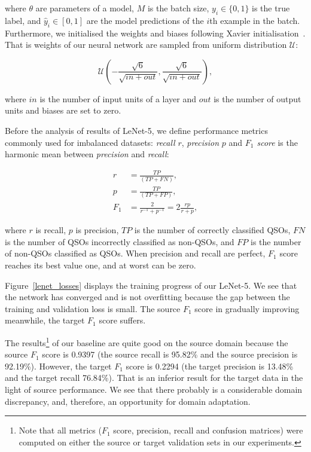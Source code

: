 where \(\theta\) are parameters of a model,
\(M\) is the batch size,
\(y_i \in \{0, 1\}\) is the true label,
and \(\hat{y}_i \in [0, 1]\) are the model predictions of the \(i\)th example in the batch.
Furthermore, we initialised the weights and biases following Xavier initialisation~\cite{glorot2010}.
That is weights of our neural network are sampled from uniform distribution \(\mathcal{U}\):

\begin{equation}
	\mathcal{U}\left(
	-\frac{\sqrt{6}}{\sqrt{\mathit{in} + \mathit{out}}},
	\frac{\sqrt{6}}{\sqrt{\mathit{in} + \mathit{out}}}
	\right),
\end{equation}

where \(\mathit{in}\) is the number of input units of a layer
and \(\mathit{out}\) is the number of output units
and biases are set to zero.

Before the analysis of results of LeNet-5,
we define performance metrics commonly used for imbalanced datasets:
\textit{recall} \(r\), \textit{precision} \(p\) and \textit{\(F_1\) score} is the harmonic mean between \textit{precision} and \textit{recall}:

\begin{align}
	r &= \frac{\mathit{TP}}{(\mathit{TP} + \mathit{FN})}, \\
	p &= \frac{\mathit{TP}}{(\mathit{TP} + \mathit{FP})}, \\
	F_1 &= \frac{2}{r^{-1} + p^{-1}} = 2 \frac{r p}{r + p},
\end{align}

where \(r\) is recall, \(p\) is precision,
\(\mathit{TP}\) is the number of correctly classified QSOs,
\(\mathit{FN}\) is the number of QSOs incorrectly classified as non-QSOs,
and \(\mathit{FP}\) is the number of non-QSOs classified as QSOs.
When precision and recall are perfect,
\(F_1\) score reaches its best value one, and at worst can be zero.

Figure~\ref{lenet_losses} displays the training progress of our LeNet-5.
We see that the network has converged and is not overfitting
because the gap between the training and validation loss is small.
The source \(F_1\) score in gradually improving meanwhile, the target \(F_1\) score suffers.

The results\footnote{Note that all metrics (\(F_1\) score, precision, recall and confusion matrices) were computed on either the source or target validation sets in our experiments.} of our baseline are quite good on the source domain
because the source \(F_1\) score is 0.9397
(the source recall is 95.82\% and the source precision is 92.19\%).
However, the target \(F_1\) score is 0.2294
(the target precision is 13.48\% and the target recall 76.84\%).
That is an inferior result for the target data in the light of source performance.
We see that there probably is a considerable domain discrepancy,
and, therefore, an opportunity for domain adaptation.

